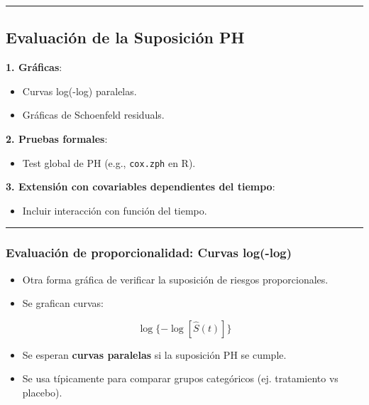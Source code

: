 \documentclass[
]{article}
\providecommand{\tightlist}{%
  \setlength{\itemsep}{0pt}\setlength{\parskip}{0pt}}\usepackage{longtable,booktabs,array}
\begin{document}
\begin{center}\rule{0.5\linewidth}{0.5pt}\end{center}

\subsection{Evaluación de la Suposición
PH}\label{evaluaciuxf3n-de-la-suposiciuxf3n-ph}

\textbf{1. Gráficas}:

\begin{itemize}
\tightlist
\item
  Curvas log(-log) paralelas.
\item
  Gráficas de Schoenfeld residuals.
\end{itemize}

\textbf{2. Pruebas formales}:

\begin{itemize}
\tightlist
\item
  Test global de PH (e.g., \texttt{cox.zph} en R).
\end{itemize}

\textbf{3. Extensión con covariables dependientes del tiempo}:

\begin{itemize}
\tightlist
\item
  Incluir interacción con función del tiempo.
\end{itemize}

\begin{center}\rule{0.5\linewidth}{0.5pt}\end{center}

\subsubsection{Evaluación de proporcionalidad: Curvas
log(-log)}\label{evaluaciuxf3n-de-proporcionalidad-curvas-log-log}

\begin{itemize}
\tightlist
\item
  Otra forma gráfica de verificar la suposición de riesgos
  proporcionales.
\item
  Se grafican curvas:
\end{itemize}

\[
\log\{-\log[\hat{S}(t)]\}
\]

\begin{itemize}
\tightlist
\item
  Se esperan \textbf{curvas paralelas} si la suposición PH se cumple.
\item
  Se usa típicamente para comparar grupos categóricos (ej. tratamiento
  vs placebo).
\end{itemize}
\end{document}
